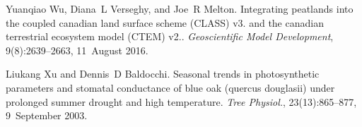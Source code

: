 \begin{DoxyDescription}
\item[\label{_CITEREF_Wu2016-zt}%
\mbox{[}62\mbox{]}]Yuanqiao Wu, Diana~L Verseghy, and Joe~R Melton. Integrating peatlands into the coupled canadian land surface scheme (C\+L\+A\+S\+S) v3. and the canadian terrestrial ecosystem model (C\+T\+E\+M) v2.. {\itshape Geoscientific Model Development}, 9(8)\+:2639--2663, 11~August 2016. 


\item[\label{_CITEREF_Xu2003-d75}%
\mbox{[}63\mbox{]}]Liukang Xu and Dennis~D Baldocchi. Seasonal trends in photosynthetic parameters and stomatal conductance of blue oak (quercus douglasii) under prolonged summer drought and high temperature. {\itshape Tree Physiol.}, 23(13)\+:865--877, 9~September 2003.


\end{DoxyDescription}